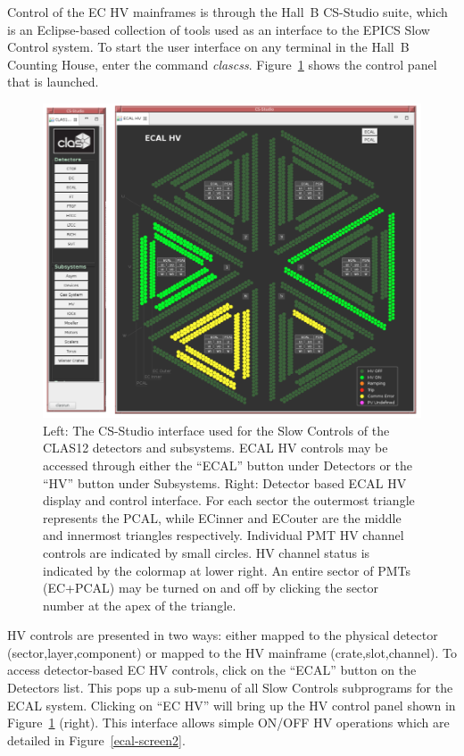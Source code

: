 \documentclass[letterpaper,10pt]{article}
\begin{document}
Control of the EC HV mainframes is through the Hall~B CS-Studio suite, which is an Eclipse-based collection 
of tools used as an interface to the EPICS Slow Control system. To start the user interface on any 
terminal in the Hall~B Counting House, enter the command {\it clascss}. Figure~\ref{ecal-screen} 
shows the control panel that is launched.
\begin{figure}[htbp]
  \centering
  \includegraphics[width= 6in, keepaspectratio = true]{cssclas-detector-interface}
  \vspace{2mm}
  \caption{Left: The CS-Studio interface used for the Slow Controls of the CLAS12 detectors and subsystems.  ECAL HV
    controls may be accessed through either the ``ECAL'' button under Detectors or the ``HV'' button under Subsystems.
  Right: Detector based ECAL HV display and control interface. For each sector the outermost triangle represents the PCAL, while
  ECinner and ECouter are the middle and innermost triangles respectively. Individual PMT HV channel controls
  are indicated by small circles. HV channel status is indicated by the colormap at lower right.  An entire sector
  of PMTs (EC+PCAL) may be turned on and off by clicking the sector number at the apex of the triangle.}
  \label{ecal-screen}
\end{figure}

HV controls are presented in two ways: either mapped to the physical detector (sector,layer,component) or
mapped to the HV mainframe (crate,slot,channel).
To access detector-based EC HV controls, click on the ``ECAL'' button on the Detectors list. This pops up a 
sub-menu of all Slow Controls subprograms for the ECAL system.  Clicking on ``EC HV''
will bring up the HV control panel shown in Figure~\ref{ecal-screen} (right). This interface allows
simple ON/OFF HV operations which are detailed in Figure~\ref{ecal-screen2}.
\end{document}
